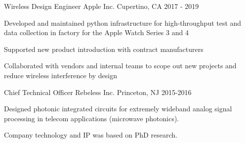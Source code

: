 \begin{cventries}
  \cventry
    {Wireless Design Engineer} %
    {Apple Inc. }
    {Cupertino, CA} %
    {2017 - 2019} %
    {
      \begin{cvitems} %
        \item {Developed and maintained python infrastructure for high-throughput test and data collection in factory for the Apple Watch Series 3 and 4}
        \item {Supported new product introduction with contract manufacturers}
        \item {Collaborated with vendors and internal teams to scope out new projects and reduce wireless interference by design}
      \end{cvitems}
    }
    
  \cventry
    {Chief Technical Officer} %
    {Rebeless Inc.}
    {Princeton, NJ} %
    {2015-2016} %
    {
      \begin{cvitems} %
        \item {Designed photonic integrated circuits for extremely wideband analog signal processing in telecom applications (microwave photonics).}
        \item {Company technology and IP was based on PhD research.}
      \end{cvitems}
    }

\end{cventries}
